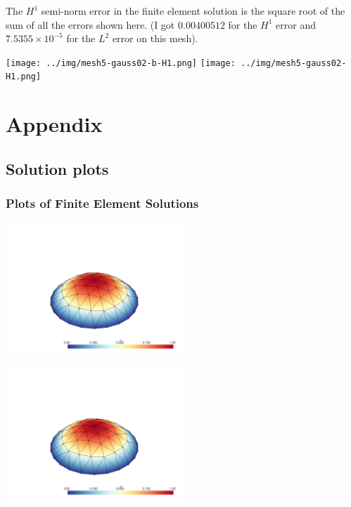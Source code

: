 \documentclass[
  11pt,
]{article}
\let\origfigure\figure
\let\endorigfigure\endfigure
\renewenvironment{figure}[1][2] {
    \expandafter\origfigure\expandafter[H]
} {
    \endorigfigure
}
\renewenvironment{quote}%
{%
\definecolor{shadecolor}{rgb}{0.96,0.96,0.96}%
\begin{shaded*}\quoting[leftmargin=0pt, vskip=0pt]
}%
{\endquoting\end{shaded*}}
\begin{document}
\begin{quote}
The \(H^1\) semi-norm error in the finite element solution is the square
root of the sum of all the errors shown here. (I got \(0.00400512\) for
the \(H^1\) error and \(7.5355\times10^{-5}\) for the \(L^2\) error on
this mesh).
\end{quote}

\texttt{[image: ../img/mesh5-gauss02-b-H1.png]}
\texttt{[image: ../img/mesh5-gauss02-H1.png]}

\newpage{}

\hypertarget{appendix}{%
\section{Appendix}\label{appendix}}

\hypertarget{solution-plots}{%
\subsection{Solution plots}\label{solution-plots}}

\hypertarget{plots-of-finite-element-solutions}{%
\subsubsection{Plots of Finite Element
Solutions}\label{plots-of-finite-element-solutions}}

\begin{figure}
\centering
\includegraphics[width=0.5\textwidth,height=\textheight]{../img/mesh1-gauss02.png}
\caption{Finite element solution for problem 1 over mesh number 1 and
order-2 numerical integration.}
\end{figure}

\begin{figure}
\centering
\includegraphics[width=0.5\textwidth,height=\textheight]{../img/mesh1-gauss05.png}
\caption{Finite element solution for problem 1 over mesh number 1 and
order-5 numerical integration.}
\end{figure}
\end{document}
